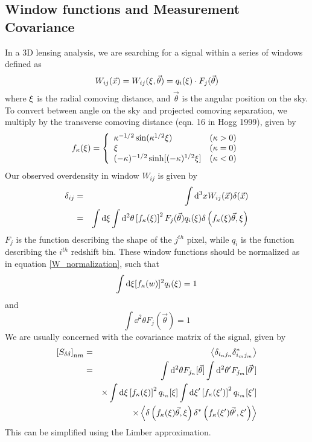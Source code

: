 \subsection{Window functions and Measurement Covariance}
In a 3D lensing analysis, we are searching for a signal within a series
of windows defined as 
\begin{equation}
  W_{ij}(\vec{x}) = W_{ij}(\xi,\vec{\theta}) 
  = q_i(\xi) \cdot F_j(\vec\theta)
\end{equation}
where $\xi$ is the radial comoving distance, and $\vec{\theta}$ is the
angular position on the sky.  To convert between angle on the sky and 
projected comoving separation, we multiply by the transverse comoving 
distance (eqn. 16 in Hogg 1999), given by
\begin{equation}
f_\kappa(\xi) = \left\{
\begin{array}{ll}
  \kappa^{-1/2} \sin (\kappa^{1/2}\xi) & (\kappa > 0) \\
  \xi  & (\kappa = 0)\\
  (-\kappa)^{-1/2} \sinh [(-\kappa)^{1/2}\xi] & (\kappa < 0)
\end{array}\right.
\end{equation}
Our observed overdensity in window $W_{ij}$ is given by
\begin{eqnarray}
  \delta_{ij} 
  & = & \int \mathrm{d}^3x W_{ij}(\vec x)\delta(\vec x)\nonumber\\
  & = & \int \mathrm{d}\xi \int \mathrm{d}^2\theta \left[ f_\kappa(\xi)\right]^2F_j(\vec{\theta})   q_i(\xi) \delta\left(f_\kappa(\xi)\vec{\theta},\xi\right)
\end{eqnarray}
$F_j$ is the function describing the shape of the $j^{th}$ pixel,
while $q_i$ is the function describing the $i^{th}$ redshift bin.
These window functions should be normalized as in equation \ref{W_normalization},
such that
\begin{equation}
  \label{q_normalization}
  \int \mathrm{d}\xi [f_\kappa(w)]^2 q_i(\xi) = 1
\end{equation}
and
\begin{equation}
  \int \dd^2\theta F_j(\vec{\theta}) = 1
\end{equation}
We are usually concerned with the covariance matrix of the signal, given by
\begin{eqnarray}
  \label{Sdd}
  \left[S_{\delta\delta}\right]_{nm}
  & = & \left\langle \delta_{i_nj_n}\delta^*_{i_mj_m}\right\rangle \nonumber\\
  & = & \int \mathrm{d}^2\theta F_{j_n}[\vec{\theta}] 
  \int \mathrm{d}^2\theta^\prime F_{j_m}[\vec{\theta}^\prime] \nonumber\\
  & & \times
  \int \mathrm{d}\xi \left[f_\kappa(\xi)\right]^2 q_{i_n}[\xi]
  \int \mathrm{d}\xi^\prime \left[f_\kappa(\xi^\prime)\right]^2 
  q_{i_m}[\xi^\prime]\nonumber\\
  & &\times
  \left\langle
  \delta\left(f_\kappa(\xi)\vec{\theta},
  \xi\right)
  \delta^*\left(f_\kappa(\xi^\prime)\vec{\theta^\prime},
  \xi^\prime\right)
  \right\rangle
\end{eqnarray}
This can be simplified using the Limber approximation.

